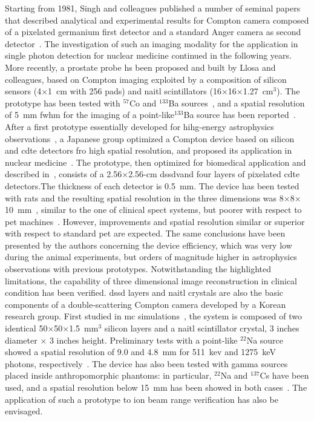 Starting from 1981, Singh and colleagues published a number of seminal papers that described analytical and experimental results for Compton camera composed of a pixelated germanium first detector and a standard Anger camera as second detector~\parencite{Singh1981, Singh1983, Singh1983b}. The investigation of such an imaging modality for the application in single photon detection for nuclear medicine continued in the following years. More recently, a prostate probe hs been proposed and built by Llosa and colleagues, based on Compton imaging exploited by a composition of silicon sensors (4$\times$1~cm with 256 pads) and \gls{naitl} scintillators (16$\times$16$\times$1.27~cm$^3$). The prototype has been tested with $^{57}$Co and $^{133}$Ba sources~\parencite{Llosa2006}, and a spatial resolution of 5~mm \gls{fwhm} for the imaging of a point-like$^{133}$Ba source has been reported~\parencite{Llosa2008}. After a first prototype essentially developed for hihg-energy astrophysics observations~\parencite{Takeda2007}, a Japanese group optimized a Compton device based on silicon and \gls{cdte} detectors fro high spatial resolution, and proposed its application in nuclear medicine~\parencite{Takeda2009}. The prototype, then optimized for biomedical application and described in~\cite{Takeda2012}, consists of a 2.56$\times$2.56-cm \gls{dssd}vand four layers of pixelated \gls{cdte} detectors.The thickness of each detector is 0.5~mm. The device has been tested with rats and the resulting spatial resolution in the three dimensions was 8$\times$8$\times$10~mm~\parencite{Suzuki2013}, similar to the one of clinical \gls{spect} systems, but poorer with respect to \gls{pet} machines~\parencite{Madsen2007}. However, improvements and spatial resolution similar or superior with respect to standard \gls{pet} are expected. The same conclusions have been presented by the authors concerning the device efficiency, which was very low during the animal experiments, but orders of magnitude higher in astrophysics observations with previous prototypes. Notwithstanding the highlighted limitations, the capability of three dimensional image reconstruction in clinical condition has been verified.
\gls{dssd} layers and \gls{naitl} crystals are also the basic components of a double-scattering Compton camera developed by a Korean research group. First studied in \gls{mc} simulations~\parencite{Seo2007}, the system is composed of two identical 50$\times$50$\times$1.5~mm$^3$ silicon layers and a \gls{naitl} scintillator crystal, 3 inches diameter $\times$ 3 inches height. Preliminary tests with a point-like $^{22}$Na source showed a spatial resolution of 9.0 and 4.8~mm for 511~kev and 1275~keV photons, respectively~\parencite{Seo2010}. The device has also been tested with gamma sources placed inside anthropomorphic phantoms: in particular, $^{22}$Na and $^{137}$Cs have been used, and a spatial resolution below 15~mm has been showed in both cases~\parencite{Seo2011}. The application of such a prototype to ion beam range verification has also be envisaged. 
